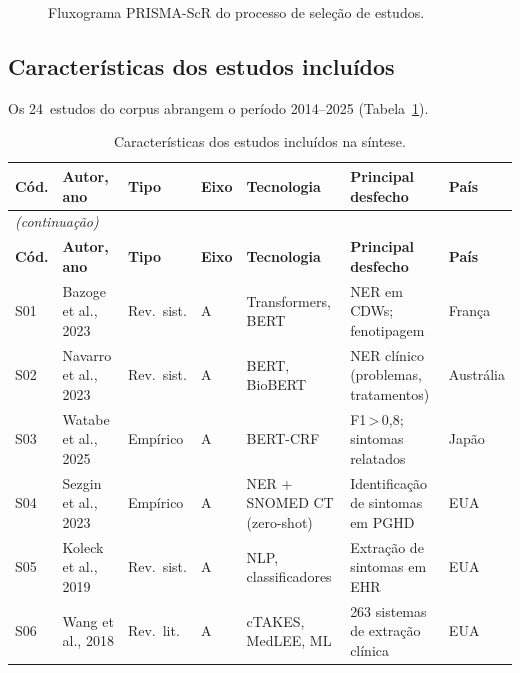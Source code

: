 \documentclass[a4paper,fleqn]{cas-sc}
\begin{document}
\begin{figure}[h]
  \centering
  \resizebox{\linewidth}{!}{}
  \caption{Fluxograma PRISMA-ScR do processo de seleção de estudos.}
  \label{fig:prisma}
\end{figure}

\subsection{Características dos estudos incluídos}

Os 24~estudos do corpus abrangem o período 2014--2025
(Tabela~\ref{tab:estudos}).

\begin{longtable}{p{0.65cm} p{2.4cm} p{1.55cm} p{0.55cm} p{2.2cm} p{2.35cm} p{1.4cm}}
\caption{Características dos estudos incluídos na síntese.}
\label{tab:estudos}\\
\toprule
\textbf{Cód.} & \textbf{Autor, ano} & \textbf{Tipo} &
\textbf{Eixo} & \textbf{Tecnologia} & \textbf{Principal desfecho} & \textbf{País} \\
\midrule
\endfirsthead
\multicolumn{7}{l}{\small\textit{(continuação)}}\\
\toprule
\textbf{Cód.} & \textbf{Autor, ano} & \textbf{Tipo} &
\textbf{Eixo} & \textbf{Tecnologia} & \textbf{Principal desfecho} & \textbf{País} \\
\midrule
\endhead
\bottomrule
\endfoot
S01 & Bazoge et al., 2023    & Rev.\ sist.  & A & Transformers, BERT         & NER em CDWs; fenotipagem               & França        \\
S02 & Navarro et al., 2023   & Rev.\ sist.  & A & BERT, BioBERT              & NER clínico (problemas, tratamentos)   & Austrália     \\
S03 & Watabe et al., 2025    & Empírico     & A & BERT-CRF                   & F1\,>\,0{,}8; sintomas relatados       & Japão         \\
S04 & Sezgin et al., 2023    & Empírico     & A & NER + SNOMED CT (zero-shot) & Identificação de sintomas em PGHD     & EUA           \\
S05 & Koleck et al., 2019    & Rev.\ sist.  & A & NLP, classificadores       & Extração de sintomas em EHR            & EUA           \\
S06 & Wang et al., 2018      & Rev.\ lit.   & A & cTAKES, MedLEE, ML         & 263 sistemas de extração clínica       & EUA           \\

\end{longtable}
\end{document}
